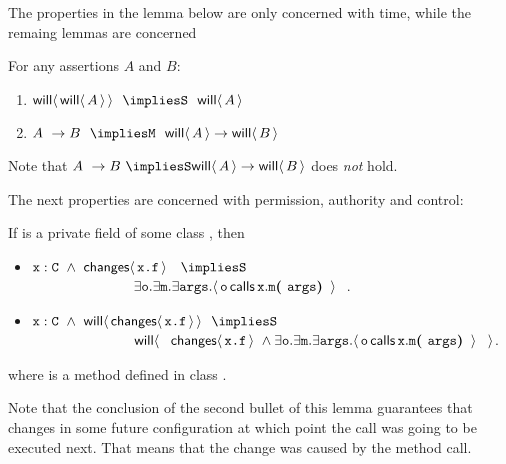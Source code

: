 \documentclass[acmsmall,screen,anonymous,review]{acmart}
\begin{document}
The properties in the lemma below are only concerned with time, while the remaing lemmas are concerned 

\begin{lemma}[Time]
\label{lemma:time}
For any assertions $A$ and $B$:

\begin{enumerate}
\item
$\Future {\Future A}  \ \  \impliesS  \ \  \Future A$
\item 
$A \ \rightarrow B \  \    \impliesM  \ \    \Future A \rightarrow \Future B$
\end{enumerate}

\end{lemma}
Note that $A \ \rightarrow B \ \impliesS   \Future A \rightarrow \Future B$ does \emph{not} hold.




The next properties are concerned with permission, authority and control:

\begin{lemma}
\label{lemma:change}
If  is a private field of some class , then

\begin{itemize}
\item
$\prg{x}:\prg{C}\ \wedge \   {\Changes{\prg{x.f}}} \ \ \ \impliesS $\\
$\strut\hspace{1in} 
     \exists \prg{o}.\exists \prg{m} .\exists \prg{args}.
 {\Calls {\prg{o}}   {\prg{m}} {\prg{x}}  {\prg{args}} } \ \ $. 

\item
$\prg{x}:\prg{C}\ \wedge \ \Future  {\Changes{\prg{x.f}}} \ \ \impliesS $\\
$\strut\hspace{1in} 
\Future {\ \  \Changes{\prg{x.f}} \ \wedge \exists \prg{o}.\exists \prg{m} .\exists \prg{args}.
 {\Calls {\prg{o}}   {\prg{m}} {\prg{x}}  {\prg{args}} } \ \ }$. 
\end{itemize}
where  is a method defined in class .

\end{lemma}

Note that the conclusion of the second bullet of this lemma guarantees that  changes in some future configuration at which point 
the call  was going to be executed next.  That means that the change was caused by the method call.
\end{document}
